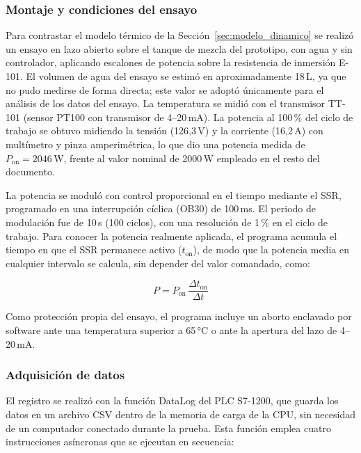 \subsubsection{Montaje y condiciones del ensayo}

Para contrastar el modelo térmico de la Sección~\ref{sec:modelo_dinamico} se realizó un ensayo en lazo abierto sobre el tanque de mezcla del prototipo, con agua y sin controlador, aplicando escalones de potencia sobre la resistencia de inmersión E-101. El volumen de agua del ensayo se estimó en aproximadamente 18\,L, ya que no pudo medirse de forma directa; este valor se adoptó únicamente para el análisis de los datos del ensayo. La temperatura se midió con el transmisor TT-101 (sensor PT100 con transmisor de 4--20\,mA). La potencia al 100\,\% del ciclo de trabajo se obtuvo midiendo la tensión (126,3\,V) y la corriente (16,2\,A) con multímetro y pinza amperimétrica, lo que dio una potencia medida de $P_{\mathrm{on}} = 2046\,\mathrm{W}$, frente al valor nominal de 2000\,W empleado en el resto del documento.

La potencia se moduló con control proporcional en el tiempo mediante el SSR, programado en una interrupción cíclica (OB30) de 100\,ms. El periodo de modulación fue de 10\,s (100 ciclos), con una resolución de 1\,\% en el ciclo de trabajo. Para conocer la potencia realmente aplicada, el programa acumula el tiempo en que el SSR permanece activo ($t_{\mathrm{on}}$), de modo que la potencia media en cualquier intervalo se calcula, sin depender del valor comandado, como:

\begin{equation}
P = P_{\mathrm{on}}\,\frac{\Delta t_{\mathrm{on}}}{\Delta t}
\label{eq:potencia_media}
\end{equation}

Como protección propia del ensayo, el programa incluye un aborto enclavado por software ante una temperatura superior a 65\,°C o ante la apertura del lazo de 4--20\,mA.

\subsubsection{Adquisición de datos}

El registro se realizó con la función DataLog del PLC S7-1200, que guarda los datos en un archivo CSV dentro de la memoria de carga de la CPU, sin necesidad de un computador conectado durante la prueba. Esta función emplea cuatro instrucciones asíncronas que se ejecutan en secuencia:

